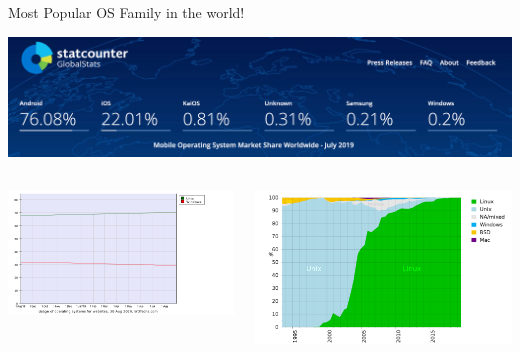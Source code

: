 \documentclass[11pt]{beamer}
\begin{document}
\begin{frame}{Most Popular OS Family in the world!}
  \begin{center}
    \includegraphics[width=0.75\linewidth]{phone-share}
  \end{center}

  \begin{columns}
    \begin{column}{0.5\linewidth}
      \includegraphics[width=\linewidth]{server}
    \end{column}
    \begin{column}{0.5\linewidth}
      \includegraphics[width=\linewidth]{supercomputer}
    \end{column}
  \end{columns}
\end{frame}
\end{document}
